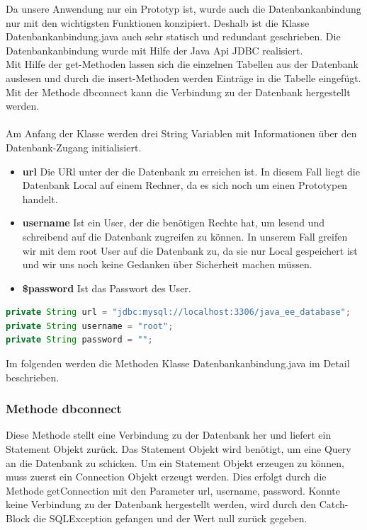 Da unsere Anwendung nur ein Prototyp ist, wurde auch die Datenbankanbindung nur mit den wichtigsten Funktionen konzipiert. Deshalb ist die Klasse Datenbankanbindung.java auch sehr statisch und redundant geschrieben. 
Die Datenbankanbindung wurde mit Hilfe der Java Api JDBC realisiert.\\
Mit Hilfe der get-Methoden lassen sich die einzelnen Tabellen aus der Datenbank auslesen und durch die insert-Methoden werden Einträge in die Tabelle eingefügt.
Mit der Methode dbconnect kann die Verbindung zu der Datenbank hergestellt werden.\\
\\
Am Anfang der Klasse werden drei String Variablen mit Informationen über den Datenbank-Zugang initialisiert.
\begin{itemize}
	\item \textbf{url} Die URl unter der die Datenbank zu erreichen ist. In diesem Fall liegt die Datenbank Local auf einem Rechner, da es sich noch um einen Prototypen handelt.
	\item \textbf{username} Ist ein User, der die benötigen Rechte hat, um lesend und schreibend auf die Datenbank zugreifen zu können. In unserem Fall greifen wir mit dem root User auf die Datenbank zu, da sie nur Local gespeichert ist und wir uns noch keine Gedanken über Sicherheit machen müssen.
	\item \textbf{\$password} Ist das Passwort des User. 
\end{itemize}

\begin{lstlisting}[language=JAVA, caption=Datenbankanbindung.java/Datenfelder, firstnumber=30]
private String url = "jdbc:mysql://localhost:3306/java_ee_database";
private String username = "root";
private String password = "";
\end{lstlisting}
\newpage
Im folgenden werden die Methoden Klasse Datenbankanbindung.java im Detail beschrieben.
 
\subsubsection{Methode dbconnect\(\)}
Diese Methode stellt eine Verbindung zu der Datenbank her und liefert ein Statement Objekt zurück. Das Statement Objekt wird benötigt, um eine Query an die Datenbank zu schicken.
Um ein Statement Objekt erzeugen zu können, muss zuerst ein Connection Objekt erzeugt werden. Dies erfolgt durch die Methode getConnection mit den Parameter url, username, password. Konnte keine Verbindung zu der Datenbank hergestellt werden, wird durch den Catch-Block die SQLException gefangen und der Wert null zurück gegeben.

